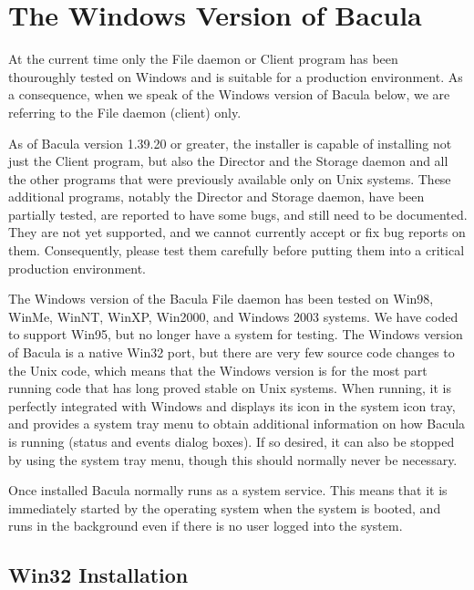 
\chapter{The Windows Version of Bacula}
\label{Win32Chapter}

At the current time only the File daemon or Client program has
been thouroughly tested on Windows and is suitable for a
production environment. As a consequence, when we
speak of the Windows version of Bacula below, we are referring to
the File daemon (client) only. 

As of Bacula version 1.39.20 or greater, the installer is capable
of installing not just the Client program, but also the Director
and the Storage daemon and all the other programs that were
previously available only on Unix systems. These additional
programs, notably the Director and Storage daemon, have been partially
tested, are reported to have some bugs, and still need to be documented. 
They are not yet supported, and we cannot currently accept or fix
bug reports on them.  Consequently, please test them carefully before putting
them into a critical production environment.

The Windows version of the Bacula File daemon has been tested on Win98, WinMe,
WinNT, WinXP, Win2000, and Windows 2003 systems.  We have coded to support
Win95, but no longer have a system for testing. The Windows version of
Bacula is a native Win32 port, but there are very few source code changes
to the Unix code, which means that the Windows version is for the most part
running code that has long proved stable on Unix systems.  When running, it
is perfectly integrated with Windows and displays its icon in the system
icon tray, and provides a system tray menu to obtain additional information
on how Bacula is running (status and events dialog boxes).  If so desired,
it can also be stopped by using the system tray menu, though this should
normally never be necessary.

Once installed Bacula normally runs as a system service. This means that it is
immediately started by the operating system when the system is booted, and
runs in the background even if there is no user logged into the system. 

\section{Win32 Installation}
\label{installation}

